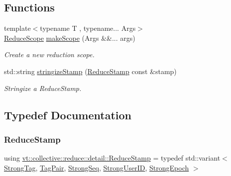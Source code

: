 \subsection*{Functions}
\begin{DoxyCompactItemize}
\item 
{\footnotesize template$<$typename T , typename... Args$>$ }\\\hyperlink{structvt_1_1collective_1_1reduce_1_1detail_1_1_reduce_scope}{Reduce\+Scope} \hyperlink{namespacevt_1_1collective_1_1reduce_1_1detail_addecbceb802231d2689ccc0c4fc8980f}{make\+Scope} (Args \&\&... args)
\begin{DoxyCompactList}\small\item\em Create a new reduction scope. \end{DoxyCompactList}\item 
std\+::string \hyperlink{namespacevt_1_1collective_1_1reduce_1_1detail_a8c155fd8428161395debd8dc0710f583}{stringize\+Stamp} (\hyperlink{namespacevt_1_1collective_1_1reduce_1_1detail_abcd205dec83706f347d55c7528bf2664}{Reduce\+Stamp} const \&stamp)
\begin{DoxyCompactList}\small\item\em Stringize a {\ttfamily Reduce\+Stamp}. \end{DoxyCompactList}\end{DoxyCompactItemize}


\subsection{Typedef Documentation}
\mbox{\label{namespacevt_1_1collective_1_1reduce_1_1detail_abcd205dec83706f347d55c7528bf2664}} 
\subsubsection{\texorpdfstring{Reduce\+Stamp}{ReduceStamp}}
{\footnotesize\ttfamily using \hyperlink{namespacevt_1_1collective_1_1reduce_1_1detail_abcd205dec83706f347d55c7528bf2664}{vt\+::collective\+::reduce\+::detail\+::\+Reduce\+Stamp} = typedef std\+::variant$<$ \hyperlink{namespacevt_1_1collective_1_1reduce_1_1detail_a5e1b708dc12ad0d1209a354ed21ed744}{Strong\+Tag}, \hyperlink{structvt_1_1collective_1_1reduce_1_1detail_1_1_tag_pair}{Tag\+Pair}, \hyperlink{namespacevt_1_1collective_1_1reduce_1_1detail_affec2854d7d65bafb17eb259714e9443}{Strong\+Seq}, \hyperlink{namespacevt_1_1collective_1_1reduce_1_1detail_af9e42b20d1be7dccc1b5e587f0387e02}{Strong\+User\+ID}, \hyperlink{namespacevt_1_1collective_1_1reduce_1_1detail_ad6739d14b8ee41189f785355708748fc}{Strong\+Epoch} $>$}



